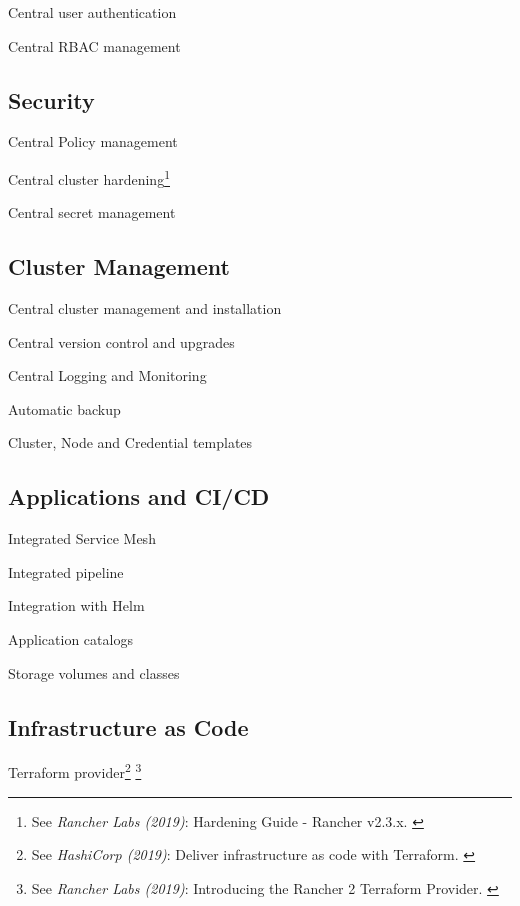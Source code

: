 Central user authentication

Central RBAC management

\subsection{Security}

Central Policy management

Central cluster hardening\footnote{See \textit{Rancher Labs (2019)}: Hardening Guide - Rancher v2.3.x. \cite{hardeningGuide}}

Central secret management

\subsection{Cluster Management}

Central cluster management and installation

Central version control and upgrades

Central Logging and Monitoring

Automatic backup 

Cluster, Node and Credential templates

\subsection{Applications and CI/CD}

Integrated Service Mesh

Integrated pipeline

Integration with Helm

Application catalogs

Storage volumes and classes

\subsection{Infrastructure as Code}

Terraform provider\footnote{See \textit{HashiCorp (2019)}: Deliver infrastructure as code with Terraform. \cite{terraform}} \footnote{See \textit{Rancher Labs (2019)}: Introducing the Rancher 2 Terraform Provider. \cite{terraformProvider}}
